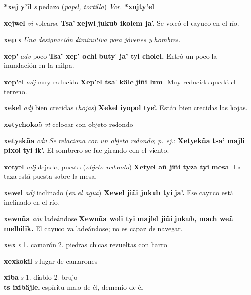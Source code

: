\documentclass[10pt]{scrbook}
\newcommand{\entry}[1]{\textbf{#1}}
\newcommand{\onedefinition}[1]{#1.}
\newcommand{\nontranslationdef}[1]{\textit{#1}}
\newcommand{\partofspeech}[1]{\textit{#1}}
\newcommand{\spanishtranslation}[1]{#1}
\newcommand{\clarification}[1]{(\textit{#1})}
\newcommand{\cholexample}[1]{\textbf{#1}}
\newcommand{\exampletranslation}[1]{#1}
\newcommand{\secondaryentry}[1]{\\\textbf{#1}}
\newcommand{\secondtranslation}[1]{#1}
\newcommand{\variation}[1]{\textit{Var.} \textbf{#1}}
\begin{document}
\begin{multicols}{2}
\entry{*xejty'il}
\partofspeech{s}
\spanishtranslation{pedazo}
\clarification{papel, tortilla}
\variation{*xujty'el}

\entry{xejwel}
\partofspeech{vi}
\spanishtranslation{volcarse}
\cholexample{Tsa' xejwi jukub ikolem ja'.}
\exampletranslation{Se volcó el cayuco en el río.}

\entry{xep}
\partofspeech{s}
\nontranslationdef{Una designación diminutiva para jóvenes y hombres.}

\entry{xep'}
\partofspeech{adv}
\spanishtranslation{poco}
\cholexample{Tsa' xep' ochi buty' ja' tyi cholel.}
\exampletranslation{Entró un poco la inundación en la milpa.}

\entry{xep'el}
\partofspeech{adj}
\spanishtranslation{muy reducido}
\cholexample{Xep'el tsa' käle jiñi lum.}
\exampletranslation{Muy reducido quedó el terreno.}

\entry{xekel}
\partofspeech{adj}
\spanishtranslation{bien crecidas}
\clarification{hojas}
\cholexample{Xekel iyopol tye'.}
\exampletranslation{Están bien crecidas las hojas.}

\entry{xetychokoñ}
\partofspeech{vt}
\spanishtranslation{colocar con objeto redondo}

\entry{xetyekña}
\partofspeech{adv}
\nontranslationdef{Se relaciona con un objeto redondo; p. ej.:}
\cholexample{Xetyekña tsa' majli pixol tyi ik'.}
\exampletranslation{El sombrero se fue girando con el viento.}

\entry{xetyel}
\partofspeech{adj}
\spanishtranslation{dejado, puesto}
\clarification{objeto redondo}
\cholexample{Xetyel añ jiñi tyza tyi mesa.}
\exampletranslation{La taza está puesta sobre la mesa.}

\entry{xewel}
\partofspeech{adj}
\spanishtranslation{inclinado}
\clarification{en el agua}
\cholexample{Xewel jiñi jukub tyi ja'.}
\exampletranslation{Ese cayuco está inclinado en el río.}

\entry{xewuña}
\partofspeech{adv}
\spanishtranslation{ladeándose}
\cholexample{Xewuña woli tyi majlel jiñi jukub, mach weñ melbilik.}
\exampletranslation{El cayuco va ladeándose; no es capaz de navegar.}

\entry{xex}
\partofspeech{s}
\onedefinition{1}
\spanishtranslation{camarón}
\onedefinition{2}
\spanishtranslation{piedras chicas revueltas con barro}

\entry{xexkokil}
\partofspeech{s}
\spanishtranslation{lugar de camarones}

\entry{xiba}
\partofspeech{s}
\onedefinition{1}
\spanishtranslation{diablo}
\onedefinition{2}
\spanishtranslation{brujo}
\secondaryentry{ts ixibäjlel}
\secondtranslation{espíritu malo de él, demonio de él}


\end{multicols}
\end{document}
